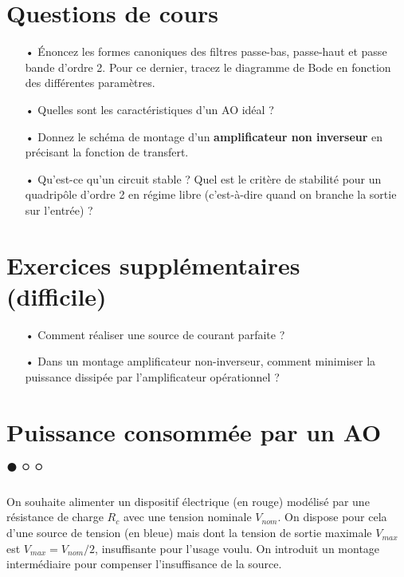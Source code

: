 \documentclass{report}
\begin{document}
\section*{Questions de cours}
\begin{itemize}

	\item[•] Énoncez les formes canoniques des filtres passe-bas, passe-haut et passe bande d'ordre 2. Pour ce dernier, tracez le diagramme de Bode en fonction des différentes paramètres.
	
	\item[•] Quelles sont les caractéristiques d'un AO idéal ?

	\item[•] Donnez le schéma de montage d'un \textbf{amplificateur non inverseur} en précisant la fonction de transfert.
	
	\item[•] Qu'est-ce qu'un circuit stable ? Quel est le critère de stabilité pour un quadripôle d'ordre 2 en régime libre (c'est-à-dire quand on branche la sortie sur l'entrée) ?

\end{itemize}

\section*{Exercices supplémentaires (difficile)}

\begin{itemize}

	\item[•] Comment réaliser une source de courant parfaite ?
	
	\item[•] Dans un montage amplificateur non-inverseur, comment minimiser la puissance dissipée par l'amplificateur opérationnel ?

\end{itemize}

\newpage

\section*{Puissance consommée par un AO $\bullet\circ\circ$}
 
On souhaite alimenter un dispositif électrique (en rouge) modélisé par une résistance de charge $R_c$ avec une tension nominale $V_{nom}$. On dispose pour cela d'une source de tension (en bleue) mais dont la tension de sortie maximale $V_{max}$ est $V_{max} = V_{nom}/2$, insuffisante pour l'usage voulu. On introduit un montage intermédiaire pour compenser l'insuffisance de la source. 
\end{document}
